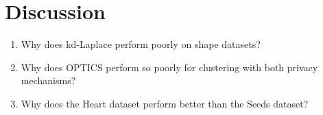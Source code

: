 \chapter{Discussion}

\begin{enumerate}
    \item Why does kd-Laplace perform poorly on shape datasets?
    \item Why does OPTICS perform so poorly for clustering with both privacy mechanisms?
    \item Why does the Heart dataset perform better than the Seeds dataset?
\end{enumerate}